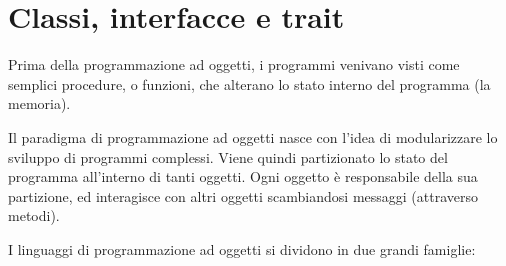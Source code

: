 \documentclass{article}
\begin{document}
\pagestyle{empty}

\section*{Classi, interfacce e trait}
\large

Prima della programmazione ad oggetti, i programmi venivano visti come semplici procedure, o funzioni, che alterano lo stato interno del programma (la memoria).

Il paradigma di programmazione ad oggetti nasce con l'idea di modularizzare lo sviluppo di programmi complessi. Viene quindi partizionato lo stato del programma all'interno di tanti oggetti. Ogni oggetto è responsabile della sua partizione, ed interagisce con altri oggetti scambiandosi messaggi (attraverso metodi).

I linguaggi di programmazione ad oggetti si dividono in due grandi famiglie: 
\end{document}
